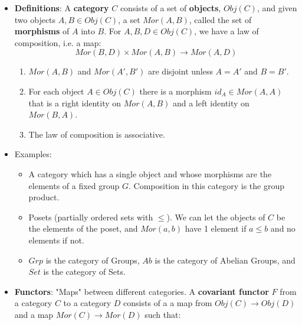 \documentclass[11pt, oneside]{amsart}   	%
\theoremstyle{definition}
\begin{document}
\begin{itemize}

	\item \textbf{Definitions}: A \textbf{category} $C$ consists of a set of \textbf{objects}, $Obj(C)$, and given two objects $A, B\in Obj(C)$, a set 
	$Mor(A, B)$, called the set of \textbf{morphisms} of $A$ into $B$. For $A, B, D\in Obj(C)$, we have a law of composition, i.e. a map:
	$$
		Mor(B, D)\times Mor(A, B) \rightarrow Mor(A, D)
	$$
	
	\begin{enumerate}
	
		\item $Mor(A, B)$ and $Mor(A', B')$ are disjoint unless $A = A'$ and $B = B'$.
		
		\item For each object $A\in Obj(C)$ there is a morphism $id_A\in Mor(A, A)$ that is a right identity on $Mor(A, B)$ and a left identity on 
		$Mor(B, A)$.
		
		\item The law of composition is associative.
	
	\end{enumerate}
	
	\item Examples:
	
	\begin{itemize}
	
		\item A category which has a single object and whose morphisms are the elements of a fixed group $G$. Composition in this category is the 
		group product.
		
		\item Posets (partially ordered sets with $\leq$). We can let the objects of $C$ be the elements of the poset, and $Mor(a, b)$ have 1 element 
		if $a\leq b$ and no elements if not.
		
		\item $Grp$ is the category of Groups, $Ab$ is the category of Abelian Groups, and $Set$ is the category of Sets.
	
	\end{itemize}
	
	\item \textbf{Functors}: "Maps" between different categories. A \textbf{covariant functor} $F$ from a category $C$ to a category $D$ consists of a 
	a map from $Obj(C)\rightarrow Obj(D)$ and a map $Mor(C)\rightarrow Mor(D)$ such that:
		\begin{enumerate}
		

\end{enumerate}
\end{itemize}
\end{document}
